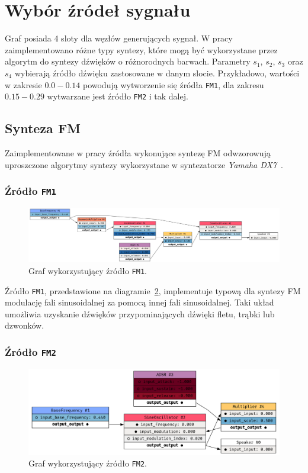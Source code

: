 \section{Wybór źródeł sygnału}

Graf posiada 4 sloty dla węzłów generujących sygnał. W pracy zaimplementowano różne
typy syntezy, które mogą być wykorzystane przez algorytm do syntezy dźwięków o różnorodnych barwach. 
Parametry $s_1$, $s_2$, $s_3$ oraz $s_4$ wybierają źródło dźwięku zastosowane w danym
slocie. Przykładowo, wartości w zakresie $0.0 - 0.14$ powodują wytworzenie się
źródła \texttt{FM1}, dla zakresu $0.15-0.29$ wytwarzane jest źródło \texttt{FM2}
i tak dalej.

\subsection{Synteza FM}

Zaimplementowane w pracy źródła wykonujące syntezę FM odwzorowują uproszczone algorytmy syntezy wykorzystane
w syntezatorze \textit{Yamaha DX7}~\cite{yamaha_dx7_manual}.

\subsubsection{Źródło \texttt{FM1}}

\begin{figure}[H]
    \centering
    \includegraphics[width=1.0\linewidth]{rys06/gene_fm1.png}
    \caption{
      Graf wykorzystujący źródło \texttt{FM1}.
    }\label{fig:gene_f1}
\end{figure}


Źródło \texttt{FM1}, przedstawione na diagramie~\ref{fig:gene_f2},
implementuje typową dla syntezy FM
modulację fali sinusoidalnej za pomocą innej fali sinusoidalnej. Taki układ umożliwia
uzyskanie dźwięków przypominających dźwięki fletu, trąbki lub dzwonków.

\subsubsection{Źródło \texttt{FM2}}

\begin{figure}[H]
    \centering
    \includegraphics[width=1.0\linewidth]{rys06/gene_fm2.png}
    \caption{
      Graf wykorzystujący źródło \texttt{FM2}.
    }\label{fig:gene_f2}
\end{figure}

